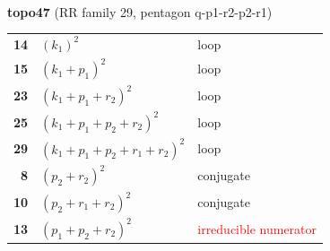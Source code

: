 \documentclass[10pt]{article}
\begin{document}
\begin{minipage}[t]{0.48\textwidth}
{}\\[2mm]\textbf{topo47} (RR family 29, pentagon q-p1-r2-p2-r1)\\[2pt]{\footnotesize\begin{tabular}{@{}r@{\ \ }l@{\ \ }l@{}}\textbf{14} & $(k_1)^2$ & loop\\
\textbf{15} & $(k_1+p_1)^2$ & loop\\
\textbf{23} & $(k_1+p_1+r_2)^2$ & loop\\
\textbf{25} & $(k_1+p_1+p_2+r_2)^2$ & loop\\
\textbf{29} & $(k_1+p_1+p_2+r_1+r_2)^2$ & loop\\
\textbf{8} & $(p_2+r_2)^2$ & conjugate\\
\textbf{10} & $(p_2+r_1+r_2)^2$ & conjugate\\
\textbf{13} & $(p_1+p_2+r_2)^2$ & \textcolor{red}{irreducible numerator}\\\end{tabular}}\end{minipage}\hfill%
\end{document}
